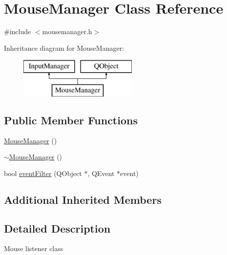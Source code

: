 \hypertarget{class_mouse_manager}{\section{Mouse\+Manager Class Reference}
\label{class_mouse_manager}
}


{\ttfamily \#include $<$mousemanager.\+h$>$}

Inheritance diagram for Mouse\+Manager\+:\begin{figure}[H]
\begin{center}
\leavevmode
\includegraphics[height=2.000000cm]{class_mouse_manager}
\end{center}
\end{figure}
\subsection*{Public Member Functions}
\begin{DoxyCompactItemize}
\item 
\hyperlink{class_mouse_manager_a6c5c9db90137f189cc49bcabb511fceb}{Mouse\+Manager} ()
\item 
\hyperlink{class_mouse_manager_a88fef729192db0b478421b6d23ac10fe}{$\sim$\+Mouse\+Manager} ()
\item 
bool \hyperlink{class_mouse_manager_a0c06cc77110510a1a36ede06dbc05488}{event\+Filter} (Q\+Object $\ast$, Q\+Event $\ast$event)
\end{DoxyCompactItemize}
\subsection*{Additional Inherited Members}


\subsection{Detailed Description}
Mouse listener class 

